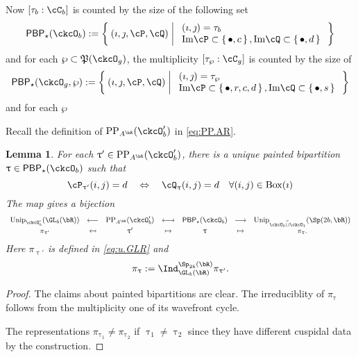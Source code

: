 \documentclass[12pt,a4paper]{amsart}
\def\Im{\operatorname{Im}}
\numberwithin{equation}{section}
\newtheorem{lem}[thm]{Lemma}
\theoremstyle{remark}
\def\Unip{\mathrm{Unip}}
\def\PP{\mathrm{PP}}
\def\BOX#1{\mathrm{Box}(#1)}
\providecommand\mapsfrom{\scalebox{-1}[1]{$\mapsto$}}
\def\Im{\mathrm{Im}}
\def\cuprow{{\stackrel{r}{\sqcup}}}
\def\CPP{\mathfrak{P}}
\def\PBP{\mathsf{PBP}}
\def\sP{\wp}
\begin{document}
Now $[\tau_{b}:\cC_{b}]$ is counted by the size of the following set
\[
  \PBP_{\star}(\ckcO_b) := \Set{(\imath,\jmath,\cP,\cQ)| %
    \begin{array}{l}
      (\imath,\jmath) = \tau_{b}\\
      \Im \cP \subset \set{\bullet,c}, \Im \cQ \subset\set{\bullet,d}\\
    \end{array}
  }
\]
and for each $\sP\subset \CPP(\ckcO_{g})$, the multiplicity
$[\tau_{\sP}: \cC_{g}]$ is counted by the size of
\[
  \PBP_{\star}(\ckcO_g,\sP):= \Set{(\imath,\jmath,\cP,\cQ)| %
    \begin{array}{l}
      (\imath,\jmath) = \tau_{\sP}\\
      \Im \cP \subset \set{\bullet,r,c,d}, \Im \cQ \subset\set{\bullet, s}\\
    \end{array}
  }
\]
and for each $\sP$

Recall the definition of $\PP_{A^{\bR}}(\ckcO'_{b})$ in  \eqref{eq:PP.AR}.

\begin{lem}
  For each $\uptau' \in \PP_{A^{\bR}}(\ckcO'_{b})$, there is a unique painted
  bipartition $\uptau\in \PBP_{\star}(\ckcO_{b})$ such that
  \[
    \cP_{\uptau'}(i,j) = d \quad %
    \Leftrightarrow
    \quad
    \cQ_{\uptau}(i,j) = d \quad \forall (i,j)\in \BOX{\imath}\\
  \]
  The map gives a bijection
  \[
    \begin{array}{ccccccc}
      \Unip_{\ckcO'_{b}}(\GL_{b}(\bR))&\longleftarrow
      &\PP_{A^{\bR}}(\ckcO'_{b}) & \longleftrightarrow
      & \PBP_{\star}(\ckcO_{b}) & \longrightarrow
      & \Unip_{\ckcO_{b}\cuprow \ckcO_{1}}(\Sp(2b,\bR))\\
      \pi_{\uptau'} & \mapsfrom & \uptau' & \mapsto
      & \uptau & \mapsto & \pi_{\uptau}.
    \end{array}
  \]
  Here $\pi_{\uptau'}$ is defined in \eqref{eq:u.GLR} and
  \[
    \pi_{\uptau} := \Ind_{\GL_{b}(\bR)}^{\Sp_{2b}(\bR)} \pi_{\uptau'}.
  \]
\end{lem}
\begin{proof}
  The claims about painted bipartitions are clear.
  The irreduciblity of $\pi_{\uptau}$ follows from the multiplicity one
  of its wavefront cycle.

  The representations $\pi_{\uptau_{1}}\neq \pi_{\uptau_{2}}$ if
  $\uptau_{1}\neq \uptau_{2}$ since they have different cuspidal data by the
  construction.
\end{proof}
\end{document}
